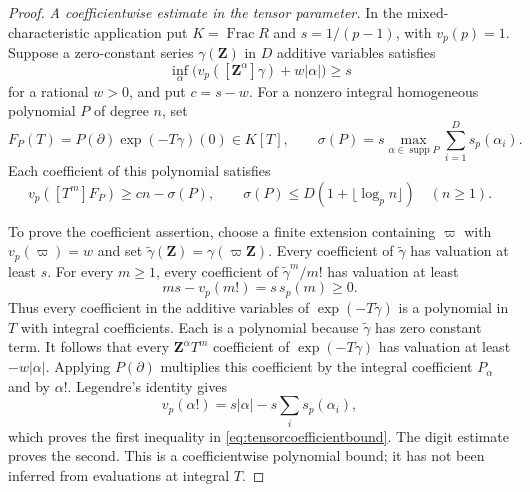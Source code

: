 \documentclass[11pt,a4paper]{article}
\theoremstyle{definition}\newtheorem{remark}[theorem]{Remark}
\begin{document}
\begin{proof}
\emph{A coefficientwise estimate in the tensor parameter.}
In the mixed-characteristic application put $K=\operatorname{Frac}R$ and $s=1/(p-1)$, with $v_p(p)=1$.
Suppose a zero-constant series $\gamma(\mathbf Z)$ in $D$ additive variables satisfies
\begin{equation}\label{eq:tensorlogprofile}
 \inf_\alpha\bigl(v_p([\mathbf Z^\alpha]\gamma)+w|\alpha|\bigr)\ge s
\end{equation}
for a rational $w>0$, and put $c=s-w$.
For a nonzero integral homogeneous polynomial $P$ of degree $n$, set
\[
 F_P(T)=P(\partial)\exp(-T\gamma)(0)\in K[T],
 \qquad
 \sigma(P)=s\max_{\alpha\in\operatorname{supp}P}
                      \sum_{i=1}^D s_p(\alpha_i).
\]
Each coefficient of this polynomial satisfies
\begin{equation}\label{eq:tensorcoefficientbound}
 v_p([T^m]F_P)\ge cn-\sigma(P),
 \qquad
 \sigma(P)\le D(1+\lfloor\log_p n\rfloor)\quad(n\ge1).
\end{equation}

To prove the coefficient assertion, choose a finite extension containing $\varpi$ with $v_p(\varpi)=w$ and set
$\widetilde\gamma(\mathbf Z)=\gamma(\varpi\mathbf Z)$.
Every coefficient of $\widetilde\gamma$ has valuation at least $s$.
For every $m\ge1$, every coefficient of $\widetilde\gamma^m/m!$ has valuation at least
\[
 ms-v_p(m!)=s\,s_p(m)\ge0.
\]
Thus every coefficient in the additive variables of
$\exp(-T\widetilde\gamma)$ is a polynomial in $T$ with integral coefficients.
Each is a polynomial because $\widetilde\gamma$ has zero constant term.
It follows that every $\mathbf Z^\alpha T^m$ coefficient of $\exp(-T\gamma)$ has valuation at least $-w|\alpha|$.
Applying $P(\partial)$ multiplies this coefficient by the integral coefficient $P_\alpha$ and by $\alpha!$.
Legendre's identity gives
\[
 v_p(\alpha!)=s|\alpha|-s\sum_i s_p(\alpha_i),
\]
which proves the first inequality in \eqref{eq:tensorcoefficientbound}.
The digit estimate proves the second.
This is a coefficientwise polynomial bound; it has not been inferred from evaluations at integral $T$.


\end{proof}
\end{document}
